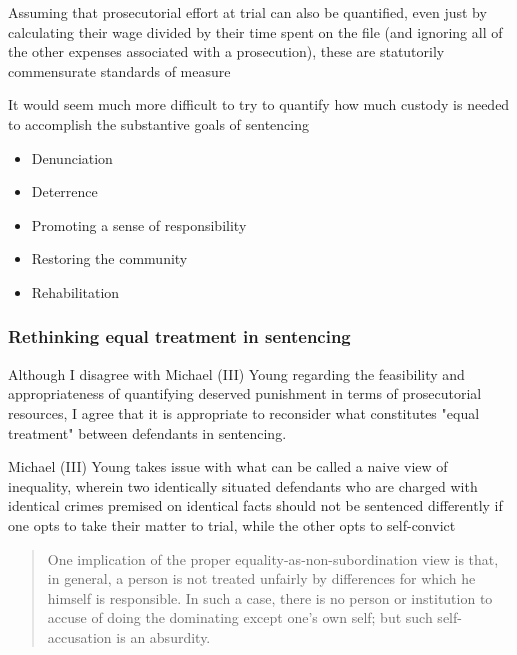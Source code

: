 Assuming that prosecutorial effort at trial can also be quantified, even just by calculating their wage divided by their time spent on the file (and ignoring all of the other expenses associated with a prosecution), these are statutorily commensurate standards of measure

It would seem much more difficult to try to quantify how much custody is needed to accomplish the substantive goals of sentencing
\begin{itemize}
    \item Denunciation
    \item Deterrence
    \item Promoting a sense of responsibility
    \item Restoring the community
    \item Rehabilitation
\end{itemize}

\subsubsection{Rethinking equal treatment in sentencing}

Although I disagree with Michael (III) Young regarding the feasibility and appropriateness of quantifying deserved punishment in terms of prosecutorial resources, I agree that it is appropriate to reconsider what constitutes "equal treatment" between defendants in sentencing.

Michael (III) Young takes issue with what can be called a naive view of inequality, wherein two identically situated defendants who are charged with identical crimes premised on identical facts should not be sentenced differently if one opts to take their matter to trial, while the other opts to self-convict

\begin{quote}
    One implication of the proper equality-as-non-subordination view is that, in general, a person is not treated unfairly by differences for which he himself is responsible. In such a case, there is no person or institution to accuse of doing the dominating except one's own self; but such self-accusation is an absurdity.
\end{quote}

